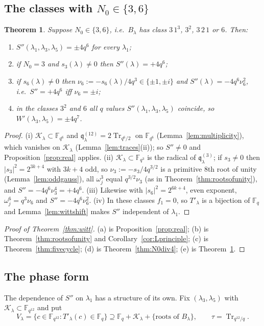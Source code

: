 \documentclass[12pt,a4paper]{amsart}
\newtheorem{theorem}{Theorem}[section]
\theoremstyle{definition}
\newcommand{\F}{\mathbb{F}}
\newcommand{\Tr}{\operatorname{Tr}}
\newcommand{\Kk}{\mathcal{K}}
\newcommand{\qq}{\mathfrak{q}}
\newcommand{\Spp}{S''}
\begin{document}
\subsection{The classes with \texorpdfstring{$N_0\in\{3,6\}$}{N0 in \{3,6\}}}
\begin{theorem}\label{thm:N0div6}
Suppose $N_0\in\{3,6\}$, i.e.\ $B_\lambda$ has class $3\,1^3$, $3^2$, $3\,2\,1$ or $6$. Then:
\begin{enumerate}[label=\textup{(\roman*)},leftmargin=2em]
\item $\Spp(\lambda_1,\lambda_3,\lambda_5)=\pm4q^6$ for every $\lambda_1$;
\item if $N_0=3$ and $s_3(\lambda)\ne0$ then $\Spp(\lambda)=+4q^6$;
\item if $s_6(\lambda)\ne0$ then $\nu_6:=-s_6(\lambda)/4q^3\in\{\pm1,\pm i\}$ and $\Spp(\lambda)=-4q^6\nu_6^2$, i.e.\ $\Spp=+4q^6$ iff $\nu_6=\pm i$;
\item in the classes $3^2$ and $6$ all $q$ values $\Spp(\lambda_1,\lambda_3,\lambda_5)$ coincide, so $W'(\lambda_3,\lambda_5)=\pm4q^7$.
\end{enumerate}
\end{theorem}
\begin{proof}
(i) $\Kk_\lambda\subset\F_{q^6}$ and $\qq^{(12)}_\lambda=2\Tr_{q^6/2}$ on $\F_{q^6}$ (Lemma~\ref{lem:multiplicity}), which vanishes on $\Kk_\lambda$ (Lemma~\ref{lem:traces}(ii)); so $\Spp\ne0$ and Proposition~\ref{prop:real} applies. (ii) $\Kk_\lambda\subset\F_{q^3}$ is the radical of $\qq^{(3)}_\lambda$; if $s_3\ne0$ then $|s_3|^2=2^{3k+4}$ with $3k+4$ odd, so $\nu_3:=-s_3/4q^{3/2}$ is a primitive $8$th root of unity (Lemma~\ref{lem:oddgauss}), all $\omega_j^3$ equal $q^{3/2}\nu_3$ (as in Theorem~\ref{thm:rootsofunity}), and $\Spp=-4q^6\nu_3^4=+4q^6$. (iii) Likewise with $|s_6|^2=2^{6k+4}$, even exponent, $\omega_j^6=q^3\nu_6$ and $\Spp=-4q^6\nu_6^2$. (iv) In these classes $f_1=0$, so $T'_\lambda$ is a bijection of $\F_q$ and Lemma~\ref{lem:wittshift} makes $\Spp$ independent of $\lambda_1$.
\end{proof}

\begin{proof}[Proof of Theorem~\ref{thm:witt}]
(a) is Proposition~\ref{prop:real}; (b) is Theorem~\ref{thm:rootsofunity} and Corollary~\ref{cor:Lprinciple}; (c) is Theorem~\ref{thm:fivecycle}; (d) is Theorem~\ref{thm:N0div4}; (e) is Theorem~\ref{thm:N0div6}.
\end{proof}

\subsection{The phase form}\label{subsec:phase}
The dependence of $\Spp$ on $\lambda_1$ has a structure of its own. Fix $(\lambda_3,\lambda_5)$ with $\Kk_\lambda\subset\F_{q^{12}}$ and put
\[
V_\lambda=\{c\in\F_{q^{12}}:T'_\lambda(c)\in\F_q\}\supseteq\F_q+\Kk_\lambda+\{\text{roots of }B_\lambda\},\qquad \tau=\Tr_{q^{12}/q}.
\]
\end{document}
